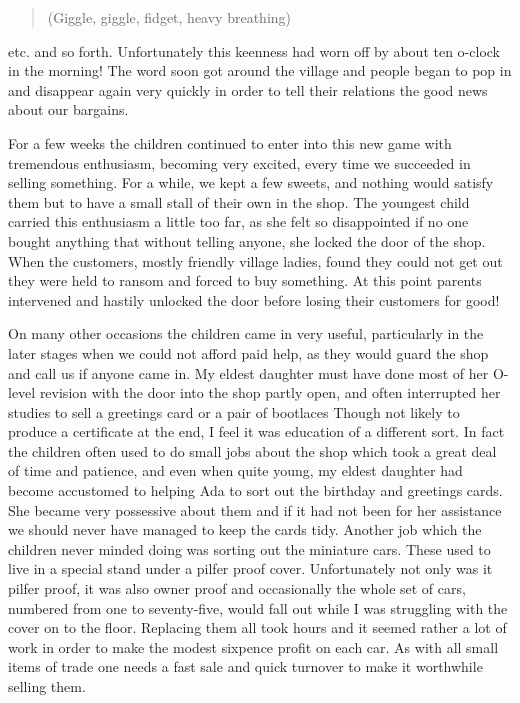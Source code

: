 \begin{quote}
 (Giggle, giggle, fidget, heavy breathing) \\
\end{quote}

etc. and so forth. Unfortunately this keenness had worn off by about ten o-clock in the morning! The word soon got around the village and people began to pop in and disappear again very quickly in order to tell their relations the good news about our bargains.

For a few weeks the children continued to enter into this new game with tremendous enthusiasm, becoming very excited, every time we succeeded in selling something. For a while, we kept a few sweets, and nothing would satisfy them but to have a small stall of their own in the shop. The youngest child carried this enthusiasm a little too far, as she felt so disappointed if no one bought anything that without telling anyone, she locked the door of the shop. When the customers, mostly friendly village ladies, found they could not get out they were held to ransom and forced to buy something. At this point parents intervened and hastily unlocked the door before losing their customers for good!

On many other occasions the children came in very useful, particularly in the later stages when we could not afford paid help, as they would guard the shop and call us if anyone came in. My eldest daughter must have done most of her O-level revision with the door into the shop partly open, and often interrupted her studies to sell a greetings card or a pair of bootlaces Though not likely to produce a certificate at the end, I feel it was education of a different sort. In fact the children often used to do small jobs about the shop which took a great deal of time and patience, and even when quite young, my eldest daughter had become accustomed to helping Ada to sort out the birthday and greetings cards. She became very possessive about them and if it had not been for her assistance we should never have managed to keep the cards tidy. Another job which the children never minded doing was sorting out the miniature cars. These used to live in a special stand under a pilfer proof cover. Unfortunately not only was it pilfer proof, it was also owner proof and occasionally the whole set of cars, numbered from one to seventy-five, would fall out while I was struggling with the cover on to the floor. Replacing them all took hours and it seemed rather a lot of work in order to make the modest sixpence profit on each car. As with all small items of trade one needs a fast sale and quick turnover to make it worthwhile selling them.
	
